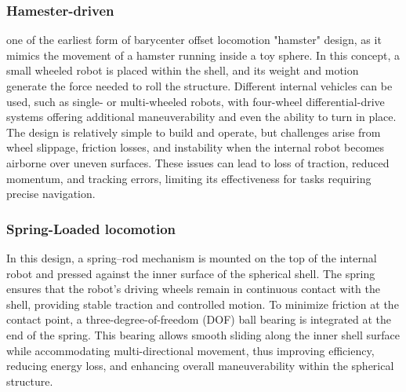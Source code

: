 \documentclass[english, bachelor, utf8]{base/thesis_telematics}
\begin{document}
\subsubsection{Hamester-driven}
one of the earliest form of barycenter offset locomotion "hamster" design, as it mimics the movement of a hamster running inside a toy sphere. 
In this concept, a small wheeled robot is placed within the shell, and its weight and motion generate the force needed to roll the structure. Different internal vehicles can be used, such as single- or multi-wheeled robots, with four-wheel differential-drive systems offering additional maneuverability and even the ability to turn in place. 
The design is relatively simple to build and operate, but challenges arise from wheel slippage, friction losses, and instability when the internal robot becomes airborne over uneven surfaces. 
These issues can lead to loss of traction, reduced momentum, and tracking errors, limiting its effectiveness for tasks requiring precise navigation.~\cite{flywheel_hamaster_explanation}

\subsubsection{Spring-Loaded locomotion}
In this design, a spring–rod mechanism is mounted on the top of the internal robot and pressed against the inner surface of the spherical shell. 
The spring ensures that the robot’s driving wheels remain in continuous contact with the shell, providing stable traction and controlled motion. 
To minimize friction at the contact point, a three-degree-of-freedom (DOF) ball bearing is integrated at the end of the spring. 
This bearing allows smooth sliding along the inner shell surface while accommodating multi-directional movement, thus improving efficiency, reducing energy loss, and enhancing overall maneuverability within the spherical structure.~\cite{old_spring_paper,flywheel_hamaster_explanation,SpheriDrive}
\end{document}
